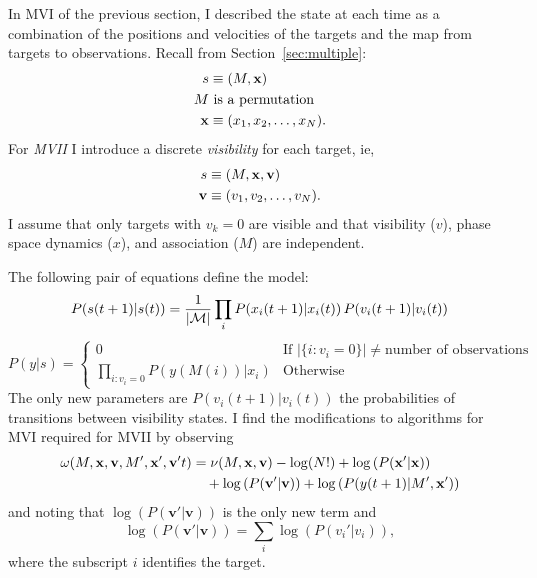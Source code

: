 \documentclass[12pt]{article}
\newcommand{\M}{{\cal M}}
\newcommand{\ti}[2]{{#1}{(#2)}}                         %
\begin{document}
In MVI of the previous section, I described the state at each time as
a combination of the positions and velocities of the targets and the
map from targets to observations.  Recall from
Section~\ref{sec:multiple}:
\begin{align*}
  s &\equiv (M,{\mathbf{x}}) \\
  M & \text{ is a permutation} \\
  {\mathbf{x}} &\equiv (x_1,x_2,\ldots,x_N).
\end{align*}
For \emph{MVII} I introduce a discrete \emph{visibility} for each
target, ie, \newcommand{\bv}{{\mathbf{v}}}
\begin{align*}
  s &\equiv (M,\bx,\bv) \\
  \bv &\equiv (v_1,v_2,\ldots,v_N).
\end{align*}
I assume that only targets with $v_k=0$ are visible and that
visibility ($v$), phase space dynamics ($x$), and association ($M$) are
independent.

The following pair of equations define the model:
\begin{equation}
  P(\ti{s}{t+1}|\ti{s}{t}) = \frac{1}{\left| \M \right|} \prod_i
  P(\ti{x_i}{t+1}|\ti{x_i}{t})\, P(\ti{v_i}{t+1}|\ti{v_i}{t})
\end{equation}
\begin{equation}
  P(y|s) =
  \begin{cases}
    0 & \text{If } \left| \{i:v_i=0 \} \right| \neq \text{number of
      observations} \\
    \prod_{i:v_i=0} P(y(M(i))|x_i) & \text{Otherwise}
  \end{cases}
\end{equation}
The only new parameters are $P(\ti{v_i}{t+1}|\ti{v_i}{t})$ the
probabilities of transitions between visibility states.  I find the
modifications to algorithms for MVI required for MVII by observing
\begin{align}
  \omega(M,\bx,\bv,M',\bx',\bv't) &= \nu(M,\bx,\bv) - \log(N!) + \log \left(
    P(\bx'|\bx)\right) \nonumber \\
  & \quad + \log \left( P(\bv'|\bv)\right) + \log \left(
  P(\ti{y}{t+1}|M',\bx')\right)
\end{align}
and noting that $\log \left( P(\bv'|\bv)\right)$ is the only new term
and
\begin{equation}
  \label{eq:1}
   \log \left( P(\bv'|\bv)\right) = \sum_i \log \left(
     P(v_i'|v_i)\right),
\end{equation}
where the subscript $i$ identifies the target.
\end{document}
